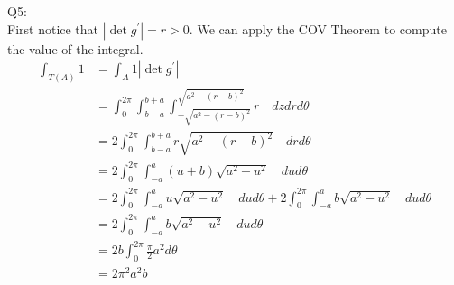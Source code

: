 \documentclass[letterpaper]{article}
\begin{document}
\noindent Q5: \\ First notice that $|\det g^\prime| = r >0$. We can apply the COV Theorem to compute the value of the integral. 
\begin{align*}
    \int_{T(A)} 1  & = \int_{A} 1 |\det g^\prime|
    \\ & = \int_0^{2\pi} \int_{b-a}^{b+a} \int_{-\sqrt{a^2-(r-b)^2}}^{\sqrt{a^2-(r-b)^2}} r \quad  dz dr d\theta \tag{by Fubini's Theorem}
    \\ & = 2 \int_0^{2\pi} \int_{b-a}^{b+a} r\sqrt{a^2-(r-b)^2}\quad dr d\theta
    \\ & = 2\int_0^{2\pi} \int_{-a}^a (u+b)\sqrt{a^2-u^2} \quad du d\theta \tag{substitution u = r-b}
    \\ & = 2\int_0^{2\pi} \int_{-a}^a u\sqrt{a^2-u^2} \quad du d\theta + 2\int_0^{2\pi} \int_{-a}^a b\sqrt{a^2-u^2} \quad du d\theta
    \\ & = 2\int_0^{2\pi} \int_{-a}^a b\sqrt{a^2-u^2} \quad du d\theta \tag{since first integral is of an odd function}
    \\ & = 2b\int_0^{2\pi} \frac{\pi}{2}a^2 d\theta
    \\ & = 2\pi^2 a^2b
\end{align*}
\end{document}
